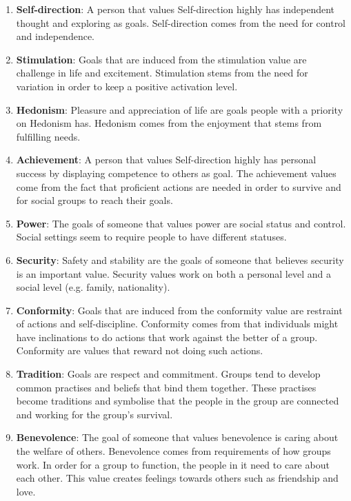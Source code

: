 \begin{enumerate}
    \item \textbf{Self-direction}: A person that values Self-direction highly has independent thought and exploring as goals. Self-direction comes from the need for control and independence.
    
    \item \textbf{Stimulation}: Goals that are induced from the stimulation value are challenge in life and excitement. Stimulation stems from the need for variation in order to keep a positive activation level.
    
    \item \textbf{Hedonism}: Pleasure and appreciation of life are goals people with a priority on Hedonism has. Hedonism comes from the enjoyment that stems from fulfilling needs. 
    
    \item \textbf{Achievement}: A person that values Self-direction highly has personal success by displaying competence to others as goal. The achievement values come from the fact that proficient actions are needed in order to survive and for social groups to reach their goals.
    
    \item \textbf{Power}: The goals of someone that values power are social status and control. Social settings seem to require people to have different statuses.
     
    \item \textbf{Security}: Safety and stability are the goals of someone that believes security is an important value. Security values work on both a personal level and a social level (e.g. family, nationality).
    
    \item \textbf{Conformity}: Goals that are induced from the conformity value are restraint of actions and self-discipline. Conformity comes from that individuals might have inclinations to do actions that work against the better of a group. Conformity are values that reward not doing such actions.
    
    \item \textbf{Tradition}: Goals are respect and commitment. Groups tend to develop common practises and beliefs that bind them together. These practises become traditions and symbolise that the people in the group are connected and working for the group's survival. 
    
    \item \textbf{Benevolence}: The goal of someone that values benevolence is caring about the welfare of others. Benevolence comes from requirements of how groups work. In order for a group to function, the people in it need to care about each other. This value creates feelings towards others such as friendship and love.
    

\end{enumerate}
